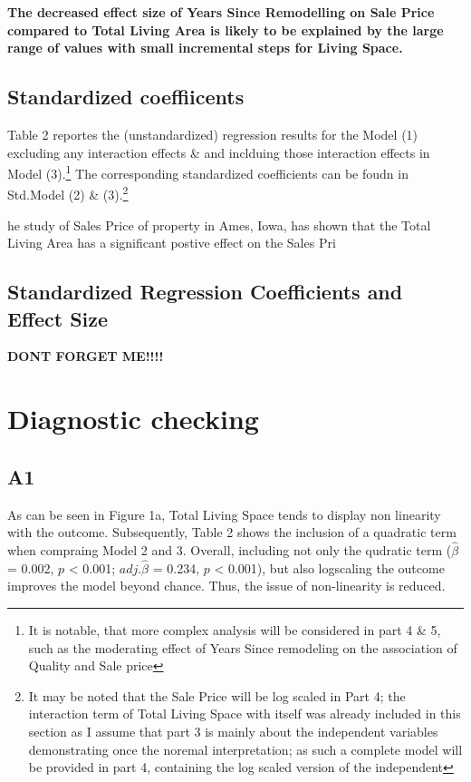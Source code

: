 \documentclass[a4paper]{article}
\begin{document}
\textbf{The decreased effect size of Years Since Remodelling on Sale Price compared to Total Living Area is likely to be explained by the large range of values with small incremental steps for Living Space.}



\subsection{Standardized coeffiicents}




Table 2 reportes the (unstandardized) regression results for the Model (1) excluding any interaction effects \& and inclduing those interaction effects in Model (3).\footnote{It is notable, that more complex analysis will be considered in part 4 \& 5, such as the moderating effect of Years Since remodeling on the association of Quality and Sale price} The corresponding standardized coefficients can be foudn in Std.Model (2) \& (3).\footnote{It may be noted that the Sale Price will be log scaled in Part 4; the interaction term of Total Living Space with itself was already included in this section as I assume that part 3 is mainly about the independent variables demonstrating once the noremal interpretation; as such a complete model will be provided in part 4, containing the log scaled version of the independent}





he study of Sales Price of property in Ames, Iowa, has shown that the Total Living Area has a significant postive effect on the Sales Pri



\subsection{Standardized Regression Coefficients and Effect Size}


\textbf{DONT FORGET ME!!!!}







\section{Diagnostic checking}
\subsection{A1}
As can be seen in Figure 1a, Total Living Space tends to display non linearity with the outcome. Subsequently, Table 2 shows the inclusion of a quadratic term when compraing Model 2 and 3. Overall, including not only the qudratic term ($\hat{\beta}$ = 0.002, $p$ < 0.001; $adj.\hat{\beta}$ = 0.234, $p$ < 0.001), but also logscaling the outcome improves the model beyond chance. Thus, the issue of non-linearity is reduced.
\end{document}
